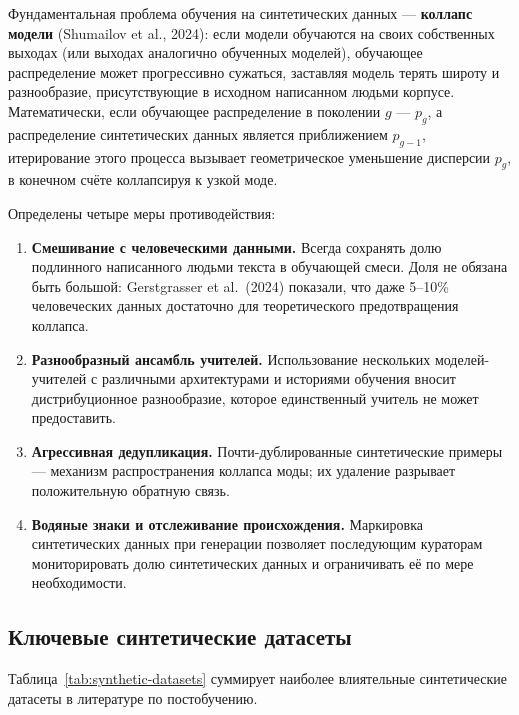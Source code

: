 Фундаментальная проблема обучения на синтетических данных --- \textbf{коллапс модели} (Shumailov et al., 2024): если модели обучаются на своих собственных выходах (или выходах аналогично обученных моделей), обучающее распределение может прогрессивно сужаться, заставляя модель терять широту и разнообразие, присутствующие в исходном написанном людьми корпусе. Математически, если обучающее распределение в поколении $g$ --- $p_g$, а распределение синтетических данных является приближением $p_{g-1}$, итерирование этого процесса вызывает геометрическое уменьшение дисперсии $p_g$, в конечном счёте коллапсируя к узкой моде.

Определены четыре меры противодействия:

\begin{enumerate}[leftmargin=*]
  \item \textbf{Смешивание с человеческими данными.} Всегда сохранять долю подлинного написанного людьми текста в обучающей смеси. Доля не обязана быть большой: Gerstgrasser et al.\ (2024) показали, что даже 5--10\% человеческих данных достаточно для теоретического предотвращения коллапса.
  \item \textbf{Разнообразный ансамбль учителей.} Использование нескольких моделей-учителей с различными архитектурами и историями обучения вносит дистрибуционное разнообразие, которое единственный учитель не может предоставить.
  \item \textbf{Агрессивная дедупликация.} Почти-дублированные синтетические примеры --- механизм распространения коллапса моды; их удаление разрывает положительную обратную связь.
  \item \textbf{Водяные знаки и отслеживание происхождения.} Маркировка синтетических данных при генерации позволяет последующим кураторам мониторировать долю синтетических данных и ограничивать её по мере необходимости.
\end{enumerate}

\subsection{Ключевые синтетические датасеты}

Таблица~\ref{tab:synthetic-datasets} суммирует наиболее влиятельные синтетические датасеты в литературе по постобучению.

